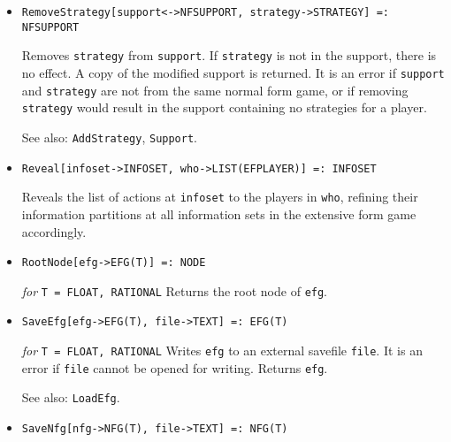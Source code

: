 \begin{itemize}
\item{}
\protect \large \begin{verbatim}
RemoveStrategy[support<->NFSUPPORT, strategy->STRATEGY] =: NFSUPPORT
\end{verbatim}\normalsize

\bd
Removes \verb+strategy+ from \verb+support+.  If \verb+strategy+ is not in
the support, there is no effect.  A copy of the modified support is
returned.  It is an error if \verb+support+ and \verb+strategy+ are
not from the same normal form game, or if removing \verb+strategy+
would result in the support containing no strategies for a player.
\item [See also:] \verb+AddStrategy+, \verb+Support+.
\ed

\item{}
\protect \large \begin{verbatim}
Reveal[infoset->INFOSET, who->LIST(EFPLAYER)] =: INFOSET
\end{verbatim}\normalsize

\bd
Reveals the list of actions at \verb+infoset+ to the players in \verb+who+,
refining their information partitions at
all information sets in the extensive form game accordingly.  
\ed

\item{}
\protect \large \begin{verbatim}
RootNode[efg->EFG(T)] =: NODE
\end{verbatim}\normalsize

{\it for} {\tt T = FLOAT, RATIONAL}
\bd
Returns the root node of \verb+efg+.
\ed


\item{}
\protect \large \begin{verbatim}
SaveEfg[efg->EFG(T), file->TEXT] =: EFG(T)
\end{verbatim}\normalsize

{\it for} {\tt T = FLOAT, RATIONAL}
\bd
Writes \verb+efg+ to an external savefile \verb+file+.  It is an error
if \verb+file+ cannot be opened for writing.  Returns \verb+efg+.
\item [See also:] \verb+LoadEfg+.
\ed

\item{}
\protect \large \begin{verbatim}
SaveNfg[nfg->NFG(T), file->TEXT] =: NFG(T)
\end{verbatim}\normalsize


\end{itemize}
